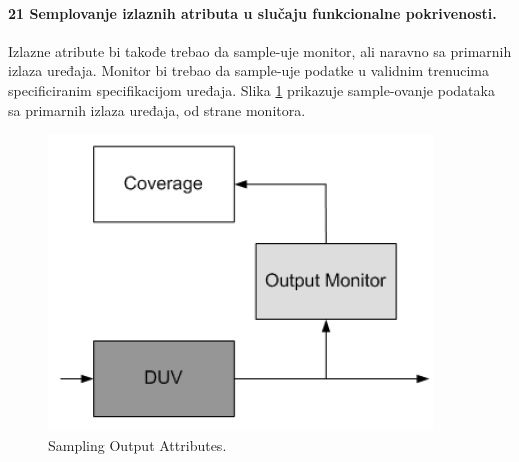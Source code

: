 \documentclass[a4paper, 12pt]{article}
\begin{document}
\paragraph{21 Semplovanje izlaznih atributa u slučaju funkcionalne pokrivenosti.}
\hfill \break
\indent Izlazne atribute bi takođe trebao da sample-uje monitor, ali naravno sa primarnih izlaza uređaja. Monitor bi trebao da sample-uje podatke u validnim trenucima specificiranim specifikacijom uređaja. Slika \ref{img-sampling-output-attributes} prikazuje sample-ovanje podataka sa primarnih izlaza uređaja, od strane monitora.
\begin{figure}[h!]
\centering
\includegraphics[scale=0.5]{img-sampling-output-attributes.png}
\caption{Sampling Output Attributes.}
\label{img-sampling-output-attributes}
\end{figure}
\end{document}
